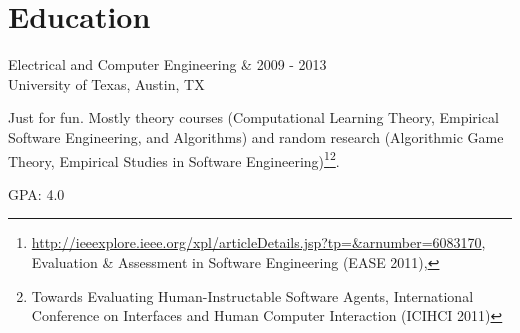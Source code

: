 \documentclass[letterpaper]{scrartcl}
\begin{document}
\section*{Education}
\begin{list1}
\item
  \begin{tabular1bold}Electrical and Computer Engineering & 2009 - 2013 \\
    University of Texas, Austin, TX
  \end{tabular1bold}

  \begin{adjustwidth}{1.5em}{1.5em}
    Just for fun. Mostly theory courses (Computational Learning Theory, Empirical Software Engineering, and Algorithms) and random research (Algorithmic Game Theory, Empirical Studies in Software Engineering)\footnote{\href{Designing human benchmark experiments for testing software agents}{http://ieeexplore.ieee.org/xpl/articleDetails.jsp?tp=\&arnumber=6083170}, Evaluation \& Assessment in Software Engineering (EASE 2011), }\footnote{Towards Evaluating Human-Instructable Software Agents, International Conference on Interfaces and Human Computer Interaction (ICIHCI 2011)}.
  \end{adjustwidth}
  \begin{list2}
  \item GPA: 4.0
  \end{list2}


\end{list1}
\end{document}
